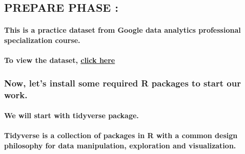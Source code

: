 \documentclass[
]{article}
\begin{document}
\hypertarget{prepare-phase}{%
\subsection{PREPARE PHASE :}\label{prepare-phase}}

\hypertarget{this-is-a-practice-dataset-from-google-data-analytics-professional-specialization-course.}{%
\paragraph{\texorpdfstring{This is a practice dataset from
\textbf{Google data analytics professional specialization
course}.}{This is a practice dataset from Google data analytics professional specialization course.}}\label{this-is-a-practice-dataset-from-google-data-analytics-professional-specialization-course.}}

\hypertarget{to-view-the-dataset-click-here}{%
\paragraph{\texorpdfstring{To view the dataset,
\href{https://drive.google.com/file/d/1iLwrjh05klmLS4tDVkU97bSI3J14CQ7X/view?usp=share_link}{click
here}}{To view the dataset, click here}}\label{to-view-the-dataset-click-here}}

\hypertarget{now-lets-install-some-required-r-packages-to-start-our-work.}{%
\subsubsection{Now, let's install some required R packages to start our
work.}\label{now-lets-install-some-required-r-packages-to-start-our-work.}}

\hypertarget{we-will-start-with-tidyverse-package.}{%
\paragraph{We will start with tidyverse
package.}\label{we-will-start-with-tidyverse-package.}}

\hypertarget{tidyverse-is-a-collection-of-packages-in-r-with-a-common-design-philosophy-for-data-manipulation-exploration-and-visualization.}{%
\paragraph{Tidyverse is a collection of packages in R with a common
design philosophy for data manipulation, exploration and
visualization.}\label{tidyverse-is-a-collection-of-packages-in-r-with-a-common-design-philosophy-for-data-manipulation-exploration-and-visualization.}}
\end{document}
